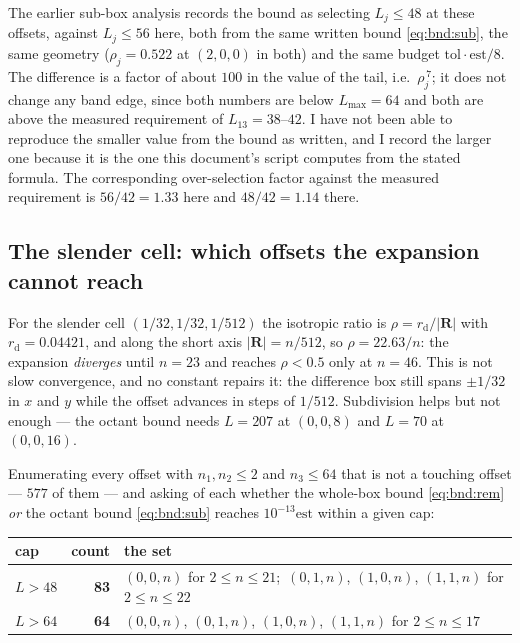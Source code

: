 \begin{remark}
\label{rem:join:disc}
The earlier sub-box analysis records the bound as selecting $L_j \le 48$ at these
offsets, against $L_j \le 56$ here, both from the same written bound
\eqref{eq:bnd:sub}, the same geometry ($\rho_j = 0.522$ at $(2,0,0)$ in both) and the
same budget $\mathrm{tol}\cdot\mathrm{est}/8$. The difference is a factor of about $100$
in the value of the tail, i.e.\ $\rho_j^{\,7}$; it does not change any band edge, since
both numbers are below $L_{\max} = 64$ and both are above the measured requirement of
$L_{13} = 38$--$42$. I have not been able to reproduce the smaller value from the bound
as written, and I record the larger one because it is the one this document's script
computes from the stated formula. The corresponding over-selection factor against the
measured requirement is $56/42 = 1.33$ here and $48/42 = 1.14$ there.
\end{remark}

\subsection{The slender cell: which offsets the expansion cannot reach}
\label{sec:join:slender}

For the slender cell $(1/32, 1/32, 1/512)$ the isotropic ratio is
$\rho = r_{\mathrm{d}}/|\mathbf{R}|$ with $r_{\mathrm{d}} = 0.04421$, and along the short
axis $|\mathbf{R}| = n/512$, so $\rho = 22.63/n$: the expansion \emph{diverges} until
$n = 23$ and reaches $\rho < 0.5$ only at $n = 46$. This is not slow convergence, and no
constant repairs it: the difference box still spans $\pm1/32$ in $x$ and $y$ while the
offset advances in steps of $1/512$. Subdivision helps but not enough --- the octant
bound needs $L = 207$ at $(0,0,8)$ and $L = 70$ at $(0,0,16)$.

Enumerating every offset with $n_1, n_2 \le 2$ and $n_3 \le 64$ that is not a touching
offset --- $577$ of them --- and asking of each whether the whole-box bound
\eqref{eq:bnd:rem} \emph{or} the octant bound \eqref{eq:bnd:sub} reaches
$10^{-13}\mathrm{est}$ within a given cap:

\begin{center}\small
\begin{tabular}{@{}lrl@{}}
\toprule
cap & count & the set\\
\midrule
$L > 48$ & \textbf{83} &
$(0,0,n)$ for $2 \le n \le 21$;\ $(0,1,n)$, $(1,0,n)$, $(1,1,n)$ for $2 \le n \le 22$\\
$L > 64$ & \textbf{64} &
$(0,0,n)$, $(0,1,n)$, $(1,0,n)$, $(1,1,n)$ for $2 \le n \le 17$\\
\bottomrule
\end{tabular}
\end{center}

